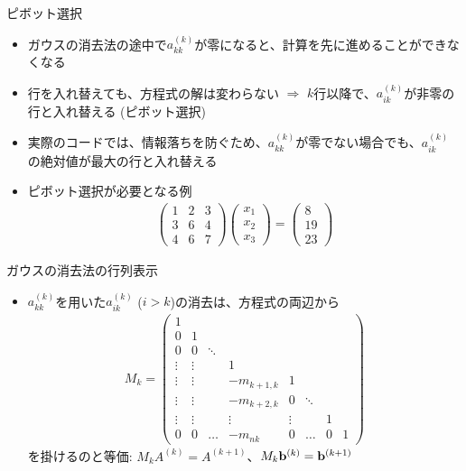 \begin{frame}[t,fragile]{ピボット選択}
  \begin{itemize}
    \setlength{\itemsep}{1em}
  \item ガウスの消去法の途中で$a_{kk}^{(k)}$が零になると、計算を先に進めることができなくなる
  \item 行を入れ替えても、方程式の解は変わらない $\Rightarrow$ $k$行以降で、$a_{ik}^{(k)}$が非零の行と入れ替える (ピボット選択)
  \item 実際のコードでは、情報落ちを防ぐため、$a_{kk}^{(k)}$が零でない場合でも、$a_{ik}^{(k)}$の絶対値が最大の行と入れ替える
  \item ピボット選択が必要となる例
    \begin{align*}
      \begin{pmatrix} 1 & 2 & 3 \\ 3 & 6 & 4 \\ 4 & 6 & 7 \end{pmatrix} \begin{pmatrix} x_1 \\ x_2 \\ x_3 \end{pmatrix} = \begin{pmatrix} 8 \\ 19 \\ 23 \end{pmatrix}
    \end{align*}
  \end{itemize}
\end{frame}

\begin{frame}[t,fragile]{ガウスの消去法の行列表示}
  \begin{itemize}
    \setlength{\itemsep}{1em}
  \item $a_{kk}^{(k)}$を用いた$a_{ik}^{(k)}$ ($i>k$)の消去は、方程式の両辺から
    \begin{align*}
      M_k = 
      \begin{pmatrix}
        1 & \\
        0 & 1 \\
        0 & 0 & \ddots \\
        \vdots & \vdots & & 1 \\
        \vdots & \vdots & & -m_{k+1,k} & 1 & \\
        \vdots & \vdots & & -m_{k+2,k} & 0 & \ddots \\
        \vdots & \vdots & & \vdots & \vdots & & 1 & \\
        0 & 0 & \hdots & -m_{nk} & 0 & \hdots & 0 & 1
      \end{pmatrix}
    \end{align*}
    を掛けるのと等価: $M_k A^{(k)} = A^{(k+1)}$、$M_k {\bf b}^{(k)} = {\bf b}^{(k+1)}$
  \end{itemize}
\end{frame}

